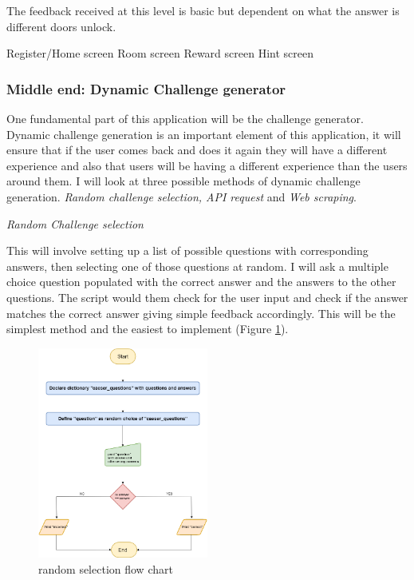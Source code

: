 \documentclass[12pt,a4paper]{article}
\begin{document}
The feedback received at this level is basic but dependent on what the answer is different doors unlock.

{Register/Home screen} 
{Room screen} 
{Reward screen} 
{Hint screen} 

\subsubsection{Middle end: Dynamic Challenge generator}  
One fundamental part of this application will be the challenge generator. Dynamic challenge generation is an important element of this application, it will ensure that if the user comes back and does it again they will have a different experience and also that users will be having a different experience than the users around them. I will look at three possible methods of dynamic challenge generation. \emph{Random challenge selection, API request} and \emph{Web scraping}.  

\emph{Random Challenge selection} 

This will involve setting up a list of possible questions with corresponding answers, then selecting one of those questions at random. I will ask a multiple choice question populated with the correct answer and the answers to the other questions. The script would them check for the user input and check if the answer matches the correct answer giving simple feedback accordingly. This will be the simplest method and the easiest to implement (Figure \ref{RandomSelection}).  

\begin{figure}[h]
    \centering
    \includegraphics[width=0.5\textwidth]{Figs/random_selection (1).png}
    \caption{random selection flow chart} 
    \label{RandomSelection}
\end{figure}   
\end{document}
